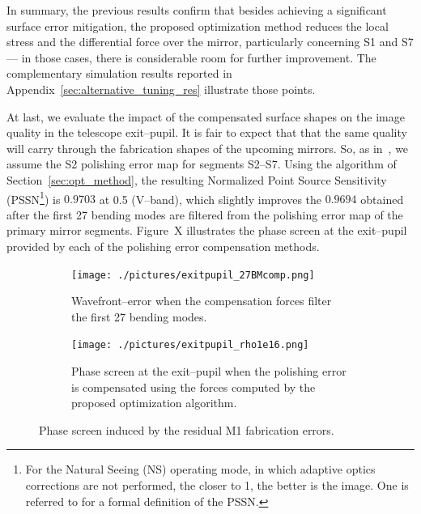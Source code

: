 \documentclass{gmto}
\begin{document}
In summary, the previous results confirm that besides achieving a significant surface error mitigation, the proposed optimization method reduces the local stress and the differential force over the mirror, particularly concerning \textsf{S1} and \textsf{S7} --- in those cases, there is considerable room for further improvement. The complementary simulation results reported in Appendix~\ref{sec:alternative_tuning_res} illustrate those points.


At last, we evaluate the impact of the compensated surface shapes on the image quality in the telescope exit--pupil. It is fair to expect that that the same quality will carry through the fabrication shapes of the upcoming mirrors. So, as in~\cite{GMT_DOC_04637}, we assume the \textsf{S2} polishing error map for segments \textsf{S2}--\textsf{S7}. Using the algorithm of Section~\ref{sec:opt_method}, the resulting Normalized Point Source Sensitivity (PSSN\footnote{
For the Natural Seeing (NS) operating mode, in which adaptive optics corrections are not performed, the closer to 1, the better is the image. One is referred to \cite[Section~3]{GMT_DOC_04680} for a formal definition of the PSSN.
}) is $0.9703$ %
at \SI{0.5}{\micron} (V--band), which slightly improves the $0.9694$ obtained after the first 27 bending modes are filtered from the polishing error map of the primary mirror segments. Figure~X illustrates the phase screen at the exit--pupil provided by each of the polishing error compensation methods.
\begin{figure}[!htb]
\begin{subfigure}[b]{0.452\textwidth}
\centering
\texttt{[image: ./pictures/exitpupil\_27BMcomp.png]}
\caption{Wavefront--error when the compensation forces filter the first 27 bending modes.\\}
\end{subfigure}
\hfill
\begin{subfigure}[b]{0.545\textwidth}
\centering
\texttt{[image: ./pictures/exitpupil\_rho1e16.png]}
\caption{Phase screen at the exit--pupil when the polishing error is compensated using the forces computed by the proposed optimization algorithm.}
\end{subfigure}
\caption{Phase screen induced by the residual M1 fabrication errors.}
\label{fig:exitpupil}
\end{figure}
\end{document}
